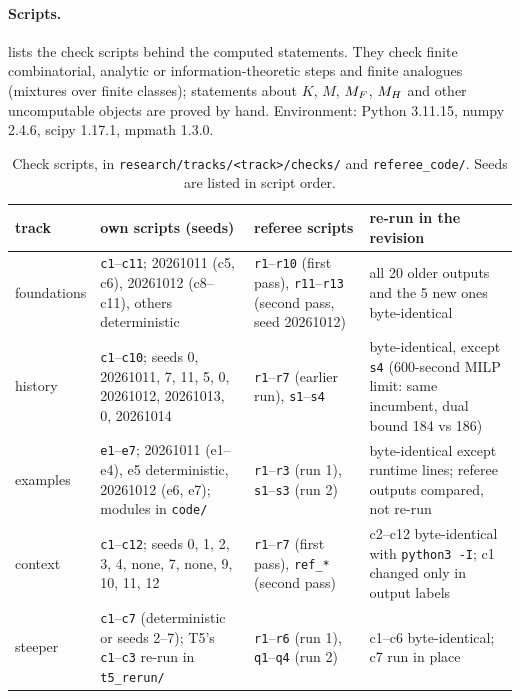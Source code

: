 \paragraph{Scripts.}  lists the check scripts behind the computed statements. They check finite combinatorial, analytic or information-theoretic steps and finite analogues (mixtures over finite classes); statements about $K$, $M$, $M_{F}$, $M_{H}$ and other uncomputable objects are proved by hand. Environment: Python 3.11.15, numpy 2.4.6, scipy 1.17.1, mpmath 1.3.0.

\begin{table}[!htbp]
\centering\footnotesize
\renewcommand{\arraystretch}{1.15}
\begin{tabularx}{\textwidth}{@{}>{\raggedright\arraybackslash}p{1.7cm}>{\raggedright\arraybackslash}p{3.3cm}>{\raggedright\arraybackslash}X>{\raggedright\arraybackslash}p{3.6cm}@{}}
\toprule
track & own scripts (seeds) & referee scripts & re-run in the revision\\
\midrule
foundations & \texttt{c1}--\texttt{c11}; 20261011 (c5, c6), 20261012 (c8--c11), others deterministic & \texttt{r1}--\texttt{r10} (first pass), \texttt{r11}--\texttt{r13} (second pass, seed 20261012) & all 20 older outputs and the 5 new ones byte-identical\\
history & \texttt{c1}--\texttt{c10}; seeds 0, 20261011, 7, 11, 5, 0, 20261012, 20261013, 0, 20261014 & \texttt{r1}--\texttt{r7} (earlier run), \texttt{s1}--\texttt{s4} & byte-identical, except \texttt{s4} (600-second MILP limit: same incumbent, dual bound 184 vs 186)\\
examples & \texttt{e1}--\texttt{e7}; 20261011 (e1--e4), e5 deterministic, 20261012 (e6, e7); modules in \texttt{code/} & \texttt{r1}--\texttt{r3} (run 1), \texttt{s1}--\texttt{s3} (run 2) & byte-identical except runtime lines; referee outputs compared, not re-run\\
context & \texttt{c1}--\texttt{c12}; seeds 0, 1, 2, 3, 4, none, 7, none, 9, 10, 11, 12 & \texttt{r1}--\texttt{r7} (first pass), \texttt{ref\_*} (second pass) & c2--c12 byte-identical with \texttt{python3 -I}; c1 changed only in output labels\\
steeper & \texttt{c1}--\texttt{c7} (deterministic or seeds 2--7); T5's \texttt{c1}--\texttt{c3} re-run in \texttt{t5\_rerun/} & \texttt{r1}--\texttt{r6} (run 1), \texttt{q1}--\texttt{q4} (run 2) & c1--c6 byte-identical; c7 run in place\\
\bottomrule
\end{tabularx}
\caption{Check scripts, in \texttt{research/tracks/<track>/checks/} and \texttt{referee\_code/}. Seeds are listed in script order.}
\label{tab:verification:scripts}
\end{table}


